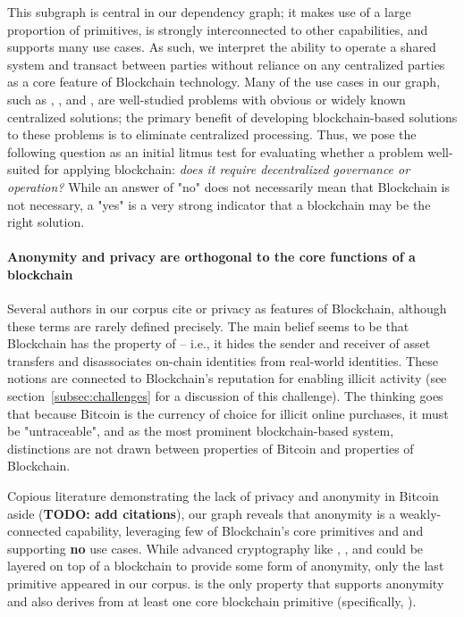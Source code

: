 {This subgraph is central in our dependency graph; it makes use of a large proportion of primitives, is strongly interconnected to other capabilities, and supports many use cases. As such, we interpret the ability to operate a shared system and transact between parties without reliance on any centralized parties as a core feature of Blockchain technology. Many of the use cases in our graph, such as , , and , are well-studied problems with obvious or widely known centralized solutions; the primary benefit of developing blockchain-based solutions to these problems is to eliminate centralized processing. Thus, we pose the following question as an initial litmus test for evaluating whether a problem well-suited for applying blockchain: \textit{does it require decentralized governance or operation?} While an answer of "no" does not necessarily mean that Blockchain is not necessary, a "yes" is a very strong indicator that a blockchain may be the right solution.

\paragraph{Anonymity and privacy are orthogonal to the core functions of a blockchain}
Several authors in our corpus cite  or privacy as features of Blockchain, although these terms are rarely defined precisely. The main belief seems to be that Blockchain has the property of  -- i.e., it hides the sender and receiver of asset transfers and disassociates on-chain identities from real-world identities. These notions are connected to Blockchain's reputation for enabling illicit activity (see section~\ref{subsec:challenges} for a discussion of this challenge). The thinking goes that because Bitcoin is the currency of choice for illicit online purchases, it must be "untraceable", and as the most prominent blockchain-based system, distinctions are not drawn between properties of Bitcoin and properties of Blockchain.

Copious literature demonstrating the lack of privacy and anonymity in Bitcoin aside (\textbf{TODO: add citations}), our graph reveals that anonymity is a weakly-connected capability, leveraging few of Blockchain's core primitives and and supporting \textbf{no} use cases. While advanced cryptography like , , and  could be layered on top of a blockchain to provide some form of anonymity, only the last primitive appeared in our corpus.  is the only property that supports anonymity and also derives from at least one core blockchain primitive (specifically, ).

}
